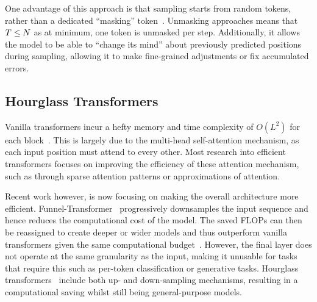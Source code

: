 One advantage of this approach is that sampling starts from random tokens,
rather than a dedicated ``masking''
token~\cite{bondtaylor2021unleashing,austin2021structured}. Unmasking approaches
means that $T \leq N$ as at minimum, one token is unmasked per step.
Additionally, it allows the model to be able to ``change its mind'' about
previously predicted positions during sampling, allowing it to make fine-grained
adjustments or fix accumulated errors.



\subsection{Hourglass Transformers}
\label{subsec:hourglass}

Vanilla transformers incur a hefty memory and time complexity of $O(L^2)$ for
each block~\cite{vaswani2017attention}. This is largely due to the multi-head
self-attention mechanism, as each input position must attend to every other.
Most research into efficient transformers focuses on improving the efficiency of
these attention mechanism, such as through sparse attention patterns or
approximations of attention.

Recent work however, is now focusing on making the overall architecture more
efficient. Funnel-Transformer~\cite{dai2020funneltransformer} progressively
downsamples the input sequence and hence reduces the computational cost of the
model. The saved FLOPs can then be reassigned to create deeper or wider models
and thus outperform vanilla transformers given the same computational
budget~\cite{dai2020funneltransformer}. However, the final layer does not
operate at the same granularity as the input, making it unusable for tasks that
require this such as per-token classification or generative tasks. Hourglass
transformers~\cite{nawrot2021hierarchical} include both up- and down-sampling
mechanisms, resulting in a computational saving whilst still being
general-purpose models.
